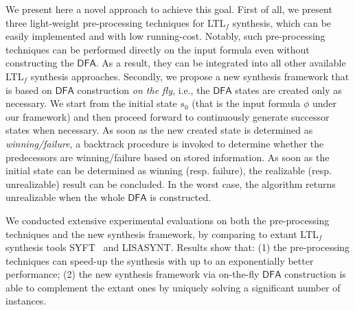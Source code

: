 \documentclass[letterpaper]{article} %
\newcommand{\ltlf}{\textsf{LTL}$_f$\xspace}
\def\dfa{$\mathsf{DFA}$\xspace}
\newcommand{\syft}{{\sf SYFT}\xspace}
\newcommand{\lisasyft}{{\sf LISASYNT}\xspace}
\begin{document}
We present here a novel approach to achieve this goal. First of all, we present three light-weight pre-processing techniques for \ltlf synthesis, which can be easily implemented and with low running-cost. Notably, such pre-processing techniques can be performed directly on the input formula even without constructing the \dfa. As a result, they can be integrated into all other available \ltlf synthesis approaches. Secondly, we propose a new synthesis framework that is based on \dfa construction \emph{on the fly}, i.e., the \dfa states are created only as necessary. We start from the initial state $s_0$ (that is the input formula $\phi$ under our framework) and then proceed forward to continuously generate successor states when necessary. As soon as the new created state is determined as \emph{winning/failure}, a backtrack procedure is invoked to determine whether the predecessors are winning/failure based on stored information. As soon as the initial state can be determined as winning (resp. failure), the realizable (resp. unrealizable) result can be concluded. In the worst case, the algorithm returns unrealizable when the whole \dfa is constructed. 

We conducted extensive experimental evaluations on both the pre-processing techniques and the new synthesis framework, by comparing to extant \ltlf synthesis tools \syft~\citep{ZTLPV17} and \lisasyft \citep{BLTV20}. Results show that: (1) the pre-processing techniques can speed-up the synthesis with up to an exponentially better performance; (2) the new synthesis framework via on-the-fly \dfa construction is able to complement the extant ones by uniquely solving a significant number of instances. 

%
\end{document}
